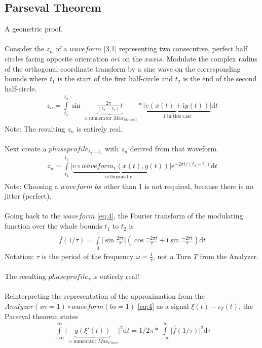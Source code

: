 \documentclass{report}
\begin{document}
\subsection{Parseval Theorem}
A geometric proof.\\\\
Consider the $z_{n}$ of a $waveform$ \cite{Grapher}[3.1] representing two consecutive, perfect half circles facing opposite orientation $ori$ on the $xaxis$. Modulate the complex radius of the orthogonal coordinate transform by a sine wave on the corresponding bounds where $t_{1}$ is the start of the first half-circle and $t_{2}$ is the end of the second half-circle.
\begin{align}
z_{n} = \int \limits _{t_{1}}^{t_{2}} \sin \underbrace{\frac{2\pi}{(t_{2}-t_{1})}t}_{\approx \text{numerator }Max_{Straight}} * \underbrace{\lvert \upsilon (x(t)+\mathrm{i}y(t)) \rvert}_{1\text{ in this case}} \mathrm{d}t \label{eq:4}
\end{align}
Note: The resulting $z_{n}$ is entirely real.\\\\
Next create a $phaseprofile_{t_{2}-t_{1}}$ with $z_{n}$ derived from that waveform.
\begin{align}
z_{n} = \int \limits _{t_{1}}^{t_{2}} \lvert \underbrace{\upsilon \circ waveform_{1}(x(t),y(t))}_{\text{orthogonal c.t.}} \rvert \mathrm{e}^{-2\pi t/(t_{2}-t_{1})}\mathrm{d}t
\end{align}
Note: Choosing a $waveform$ $bs$ other than 1 is not required, because there is no jitter (perfect).\\\\
Going back to the $waveform$ \eqref{eq:4}, the Fourier transform of the modulating function over the whole bounds $t_{1}$ to $t_{2}$ is
\begin{align}
\hat{f}(1/\tau) = \int \limits _{0}^{\tau} \lvert \sin \frac{2\pi t}{\tau}\rvert (\cos \frac{-2\pi t}{\tau} + \mathrm{i} \sin \frac{-2\pi t}{\tau}) \mathrm{d}t
\end{align}
Notation: $\tau$ is the period of the frequency $\omega=\frac{1}{\tau}$, not a Turn $T$ from the Analyzer.\\\\
The resulting $phaseprofile_{\tau}$ is entirely real!\\\\
Reinterpreting the representation of the approximation from the $Analyzer(sn=1) \circ waveform(bs=1)$ \eqref{eq:4} as a signal $\xi (t) - \iota_{T}(t)$, the Parseval theorem states
\begin{align}
\int\limits_{-\infty}^{\infty} \lvert \underbrace{y(\xi '(t))}_{\approx \text{numerator }Max_{Curve}}\rvert ^2 \mathrm{d} t = 1/2\pi * \int\limits_{-\infty}^{\infty} \vert \hat{f}(1/\tau) \vert ^2 \mathrm{d} \tau
\end{align}
\end{document}
